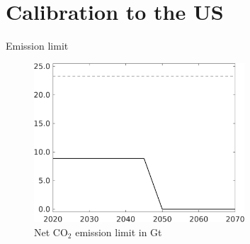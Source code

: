 \documentclass[11pt,aspectratio=169]{beamer}
\begin{document}
\section{Calibration to the US}
\begin{frame}{Emission limit}
	\begin{center}
		\hspace{-20mm}
		\begin{minipage}{0.8\textwidth}
			\begin{figure}
				\caption{Net CO$_2$ emission limit in Gt}
				\includegraphics[width=0.7\textwidth]{../codding_model/own_basedOnFried/optimalPol_010922_revision/figures/all_13Sept22_Tplus30/Emnet_goals_o0_lgd0.png}
			\end{figure}
		\end{minipage}
		\hspace{-20mm}

\end{center}
\end{frame}
\end{document}
